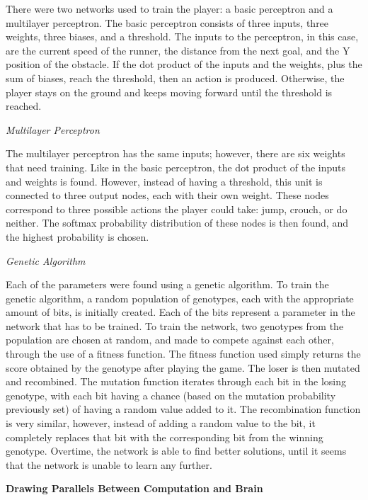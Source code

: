 \documentclass[12pt]{article}
\begin{document}
\begin{flushleft}
There were two networks used to train the player: a basic perceptron and a multilayer perceptron. The basic perceptron consists of three inputs, three weights, three biases, and a threshold. The inputs to the perceptron, in this case, are the current speed of the runner, the distance from the next goal, and the Y position of the obstacle. If the dot product of the inputs and the weights, plus the sum of biases, reach the threshold, then an action is produced. Otherwise, the player stays on the ground and keeps moving forward until the threshold is reached. 

\hfill

\noindent\emph{Multilayer Perceptron}

The multilayer perceptron has the same inputs; however, there are six weights that need training. Like in the basic perceptron, the dot product of the inputs and weights is found. However, instead of having a threshold, this unit is connected to three output nodes, each with their own weight. These nodes correspond to three possible actions the player could take: jump, crouch, or do neither. The softmax probability distribution of these nodes is then found, and the highest probability is chosen. 

\hfill

\noindent\emph{Genetic Algorithm}

Each of the parameters were found using a genetic algorithm. To train the genetic algorithm, a random population of genotypes, each with the appropriate amount of bits, is initially created. Each of the bits represent a parameter in the network that has to be trained. To train the network, two genotypes from the population are chosen at random, and made to compete against each other, through the use of a fitness function. The fitness function used simply returns the score obtained by the genotype after playing the game. The loser is then mutated and recombined. The mutation function iterates through each bit in the losing genotype, with each bit having a chance (based on the mutation probability previously set) of having a random value added to it. The recombination function is very similar, however, instead of adding a random value to the bit, it completely replaces that bit with the corresponding bit from the winning genotype. Overtime, the network is able to find better solutions, until it seems that the network is unable to learn any further.

\hfill

\noindent\textbf{Drawing Parallels Between Computation and Brain}


\end{flushleft}
\end{document}
